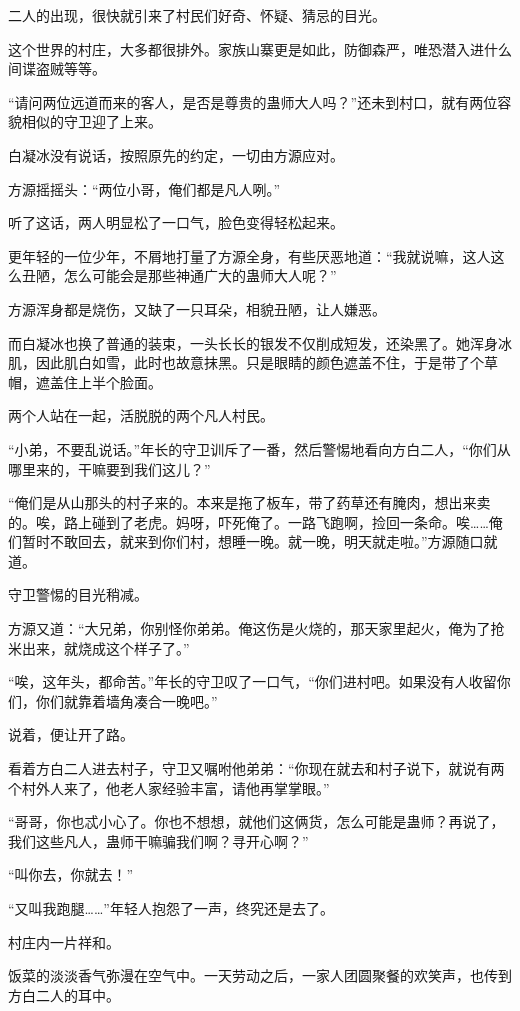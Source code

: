 \begin{this_body}
二人的出现，很快就引来了村民们好奇、怀疑、猜忌的目光。

这个世界的村庄，大多都很排外。家族山寨更是如此，防御森严，唯恐潜入进什么间谍盗贼等等。

“请问两位远道而来的客人，是否是尊贵的蛊师大人吗？”还未到村口，就有两位容貌相似的守卫迎了上来。

白凝冰没有说话，按照原先的约定，一切由方源应对。

方源摇摇头：“两位小哥，俺们都是凡人咧。”

听了这话，两人明显松了一口气，脸色变得轻松起来。

更年轻的一位少年，不屑地打量了方源全身，有些厌恶地道：“我就说嘛，这人这么丑陋，怎么可能会是那些神通广大的蛊师大人呢？”

方源浑身都是烧伤，又缺了一只耳朵，相貌丑陋，让人嫌恶。

而白凝冰也换了普通的装束，一头长长的银发不仅削成短发，还染黑了。她浑身冰肌，因此肌白如雪，此时也故意抹黑。只是眼睛的颜色遮盖不住，于是带了个草帽，遮盖住上半个脸面。

两个人站在一起，活脱脱的两个凡人村民。

“小弟，不要乱说话。”年长的守卫训斥了一番，然后警惕地看向方白二人，“你们从哪里来的，干嘛要到我们这儿？”

“俺们是从山那头的村子来的。本来是拖了板车，带了药草还有腌肉，想出来卖的。唉，路上碰到了老虎。妈呀，吓死俺了。一路飞跑啊，捡回一条命。唉……俺们暂时不敢回去，就来到你们村，想睡一晚。就一晚，明天就走啦。”方源随口就道。

守卫警惕的目光稍减。

方源又道：“大兄弟，你别怪你弟弟。俺这伤是火烧的，那天家里起火，俺为了抢米出来，就烧成这个样子了。”

“唉，这年头，都命苦。”年长的守卫叹了一口气，“你们进村吧。如果没有人收留你们，你们就靠着墙角凑合一晚吧。”

说着，便让开了路。

看着方白二人进去村子，守卫又嘱咐他弟弟：“你现在就去和村子说下，就说有两个村外人来了，他老人家经验丰富，请他再掌掌眼。”

“哥哥，你也忒小心了。你也不想想，就他们这俩货，怎么可能是蛊师？再说了，我们这些凡人，蛊师干嘛骗我们啊？寻开心啊？”

“叫你去，你就去！”

“又叫我跑腿……”年轻人抱怨了一声，终究还是去了。

村庄内一片祥和。

饭菜的淡淡香气弥漫在空气中。一天劳动之后，一家人团圆聚餐的欢笑声，也传到方白二人的耳中。


\end{this_body}
